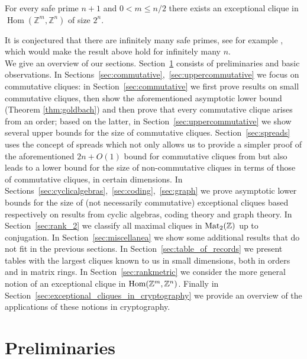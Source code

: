 \documentclass{amsart}
\theoremstyle{plain}
\newenvironment{maintheorem}[1]
  {\renewcommand\theinnermaintheorem{\ref{#1}}\innermaintheorem}
  {\endinnermaintheorem}
\theoremstyle{definition}
\DeclareMathOperator{\Hom}{Hom}
\newcommand{\Z}{\ensuremath{\mathbb{Z}}}
\begin{document}
\begin{maintheorem}{thm:rank-metric}
For every safe prime \(n+1\) and \(0<m\leq n/2\) there exists an exceptional clique in \(\Hom(\Z^m,\Z^n)\) of size \(2^n\).
\end{maintheorem}

It is conjectured that there are infinitely many safe primes, see for example \cite{Shoup}, which would make the result above hold for infinitely many $n$.\\

We give an overview of our sections.
Section~\ref{sec:preliminaries} consists of preliminaries and basic observations. In Sections~\ref{sec:commutative},~\ref{sec:uppercommutative} we focus on commutative cliques: in Section~\ref{sec:commutative} we first prove results on small commutative cliques, then show the aforementioned asymptotic lower bound (Theorem \ref{thm:goldbach}) and then prove that every commutative clique arises from an order; based on the latter, in Section~\ref{sec:uppercommutative} we show several upper bounds for the size of commutative cliques.
Section~\ref{sec:spreads} uses the concept of spreads which not only allows us to provide a simpler proof of the aforementioned \(2n+O(1)\) bound for commutative cliques from \cite{Leutbecher} but also leads to a lower bound for the size of non-commutative cliques in terms of those of commutative cliques, in certain dimensions.
In Sections~\ref{sec:cyclicalgebras},~\ref{sec:coding},~\ref{sec:graph} we prove asymptotic lower bounds for the size of (not necessarily commutative) exceptional cliques based respectively on results from cyclic algebras, coding theory and graph theory. In Section~\ref{sec:rank_2} we classify all maximal cliques in \(\textup{Mat}_2(\Z)\) up to conjugation. In Section~\ref{sec:miscellanea} we show some additional results that do not fit in the previous sections. In Section~\ref{sec:table_of_records} we present tables with the largest cliques known to us in small dimensions, both in orders and in matrix rings. In Section~\ref{sec:rankmetric} we consider the more general notion of an exceptional clique in \(\textup{Hom}(\Z^m,\Z^n)\). Finally in Section~\ref{sec:exceptional_cliques_in_cryptography} we provide an overview of the applications of these notions in cryptography.


%


\section{Preliminaries}\label{sec:preliminaries}
\end{document}

